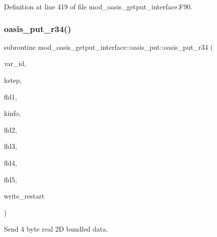 Definition at line 419 of file mod\+\_\+oasis\+\_\+getput\+\_\+interface.\+F90.

\mbox{\label{interfacemod__oasis__getput__interface_1_1oasis__put_a58fd29713950ff380f847bbb88cdca2b}} 
\subsubsection{\texorpdfstring{oasis\+\_\+put\+\_\+r34()}{oasis\_put\_r34()}}
{\footnotesize\ttfamily subroutine mod\+\_\+oasis\+\_\+getput\+\_\+interface\+::oasis\+\_\+put\+::oasis\+\_\+put\+\_\+r34 (\begin{DoxyParamCaption}\item[{integer(kind=ip\+\_\+i4\+\_\+p), intent(in)}]{var\+\_\+id,  }\item[{integer(kind=ip\+\_\+i4\+\_\+p), intent(in)}]{kstep,  }\item[{real(kind=ip\+\_\+single\+\_\+p), dimension(\+:,\+:,\+:)}]{fld1,  }\item[{integer(kind=ip\+\_\+i4\+\_\+p), intent(out)}]{kinfo,  }\item[{real(kind=ip\+\_\+single\+\_\+p), dimension(\+:,\+:,\+:), optional}]{fld2,  }\item[{real(kind=ip\+\_\+single\+\_\+p), dimension(\+:,\+:,\+:), optional}]{fld3,  }\item[{real(kind=ip\+\_\+single\+\_\+p), dimension(\+:,\+:,\+:), optional}]{fld4,  }\item[{real(kind=ip\+\_\+single\+\_\+p), dimension(\+:,\+:,\+:), optional}]{fld5,  }\item[{logical, optional}]{write\+\_\+restart }\end{DoxyParamCaption})\hspace{0.3cm}{\ttfamily [private]}}



Send 4 byte real 2D bundled data. 


